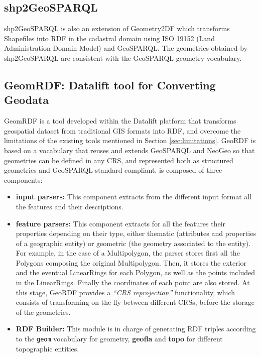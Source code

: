 \subsection{shp2GeoSPARQL}
shp2GeoSPARQL \cite{saavedra14} is also an extension of Geometry2DF which transforms Shapefiles into RDF in the cadastral domain using ISO 19152 \cite{iso2012} (Land Administration Domain Model) and GeoSPARQL. The geometries obtained by shp2GeoSPARQL are consistent with the GeoSPARQL geometry vocabulary.






\subsection{GeomRDF: Datalift tool for Converting Geodata}
\label{sec:geomRDF}
GeomRDF \cite{hamdi14} is a tool developed within the Datalift platform that transforms geospatial dataset from traditional GIS formats into RDF, and overcome the limitations of the existing tools mentioned in Section \ref{sec:limitations}. GeoRDF is based on a vocabulary that reuses and extends GeoSPARQL and NeoGeo so that geometries can be defined in any CRS, and represented both as structured geometries and GeoSPARQL standard compliant. \geom is composed of three components:

\begin{itemize}
\item \textbf{input parsers:} This component extracts from the different input format all the features and their descriptions.
\item \textbf{feature parsers:} This component extracts for all the features their properties depending on their type, either thematic (attributes and properties of a geographic entity) or geometric (the geometry associated to the entity). For example, in the case of a Multipolygon, the parser stores first all the Polygons composing the original Multipolygon. Then, it stores the exterior and the eventual LinearRings for each Polygon, as well as the points included in the LinearRings. Finally the coordinates of each point are also stored. At this stage, GeoRDF provides a \textit{``CRS reprojection''} functionality, which consists of transforming on-the-fly between different CRSs, before the storage of the geometries.

\item  \textbf{RDF Builder:} This module is in charge of generating RDF triples according to the \texttt{geom} vocabulary for geometry, \textbf{geofla} and \textbf{topo} for different topographic entities.


\end{itemize}

